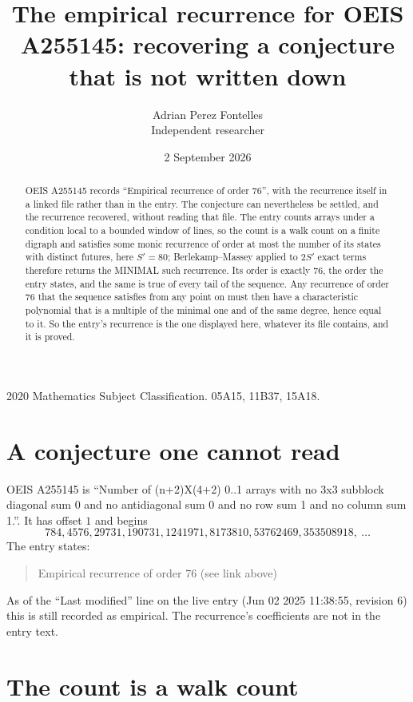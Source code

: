 \documentclass[11pt,a4paper]{article}
\title{The empirical recurrence for OEIS A255145: recovering a conjecture that is not written down}
\author{Adrian Perez Fontelles\\ \small Independent researcher}
\date{2 September 2026}
\theoremstyle{plain}
\theoremstyle{definition}
\begin{document}
\maketitle

\begin{abstract}
OEIS A255145 records ``Empirical recurrence of order $76$'', with the recurrence itself in a
linked file rather than in the entry. The conjecture can nevertheless be settled, and the
recurrence recovered, without reading that file. The entry counts arrays under a condition
local to a bounded window of lines, so the count is a walk count on a finite digraph and
satisfies some monic recurrence of order at most the number of its states with distinct
futures, here $S'=80$; Berlekamp--Massey applied to $2S'$ exact
terms therefore returns the MINIMAL such recurrence. Its order is exactly $76$, the order
the entry states, and the same is true of every tail of the sequence. Any recurrence of order
$76$ that the sequence satisfies from any point on must then have a characteristic
polynomial that is a multiple of the minimal one and of the same degree, hence equal to it. So
the entry's recurrence is the one displayed here, whatever its file contains, and it is
proved.
\end{abstract}

\noindent\small 2020 Mathematics Subject Classification. 05A15, 11B37, 15A18.\normalsize

\section{A conjecture one cannot read}

OEIS A255145 is ``Number of (n+2)X(4+2) 0..1 arrays with no 3x3 subblock diagonal sum 0 and no antidiagonal sum 0 and no row sum 1 and no column sum 1.''. It has offset $1$ and begins
\[
784, 4576, 29731, 190731, 1241971, 8173810, 53762469, 353508918,\ \dots
\]
The entry states:
\begin{quote}
Empirical recurrence of order 76 (see link above)
\end{quote}
As of the ``Last modified'' line on the live entry (Jun 02 2025 11:38:55, revision 6) this is still
recorded as empirical. The recurrence's coefficients are not in the entry text.

\section{The count is a walk count}
\end{document}
